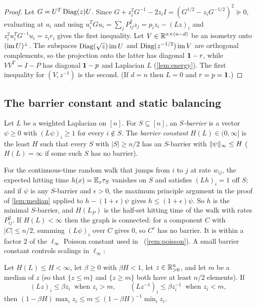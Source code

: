 \begin{proof}
Let $G=U^T\operatorname{Diag}(z)U$. Since $G+z_i^2G^{-1}-2z_iI=(G^{1/2}-z_iG^{-1/2})^2\succeq0$,
evaluating at $u_i$ and using $u_i^TGu_i=\sum_jP_{ij}^2z_j=p_iz_i-(Lz)_i$ and
$z_i^2u_i^TG^{-1}u_i=z_ir_i$ gives the first inequality. Let
$V\in\mathbb R^{n\times(n-d)}$ be an isometry onto $(\operatorname{im} U)^\perp$. The subspaces
$\operatorname{Diag}(\sqrt z)\operatorname{im} U$ and $\operatorname{Diag}(z^{-1/2})\operatorname{im} V$ are orthogonal complements, so
the projection onto the latter has diagonal $\mathbf 1-r$, while $VV^T=I-P$ has
diagonal $\mathbf 1-p$ and Laplacian $L$ (\cref{lem:energy}). The first inequality
for $(V,z^{-1})$ is the second. (If $d=n$ then $L=0$ and $r=p=\mathbf 1$.)
\end{proof}

\subsection{The barrier constant and static balancing}

\begin{definition}\label{def:barrier}
Let $L$ be a weighted Laplacian on $[n]$. For $S\subseteq[n]$, an
\emph{$S$-barrier} is a vector $\psi\ge0$ with $(L\psi)_i\ge1$ for every
$i\notin S$. The \emph{barrier constant} $H(L)\in(0,\infty]$ is the least $H$ such
that every $S$ with $|S|\ge n/2$ has an $S$-barrier with $\lVert \psi\rVert_\infty\le H$
($H(L)=\infty$ if some such $S$ has no barrier).
\end{definition}

For the continuous-time random walk that jumps from $i$ to $j$ at rate $w_{ij}$,
the expected hitting time $h(x)=\mathbb E_x\tau_S$ vanishes on $S$ and satisfies
$(Lh)_i=1$ off $S$; and if $\psi$ is any $S$-barrier and $\epsilon>0$, the maximum
principle argument in the proof of \cref{lem:median} applied to
$h-(1+\epsilon)\psi$ gives $h\le(1+\epsilon)\psi$. So $h$ is the minimal $S$-barrier,
and $H(L_P)$ is the half-set hitting time of the walk with rates $P_{ij}^2$. If
$H(L)<\infty$ then the graph is connected: for a component $C$ with
$|C|\le n/2$, summing $(L\psi)_i$ over $C$ gives $0$, so $C^c$ has no barrier. It is within a factor $2$ of the $\ell_\infty$ Poisson constant used
in~\cite{Orig} (\cref{rem:poisson}). A small barrier constant controls scalings
in $\ell_\infty$:

\begin{lemma}\label{lem:median}
Let $H(L)\le H<\infty$, let $\beta\ge0$ with $\beta H<1$, let
$z\in\mathbb R^n_{>0}$, and let $m$ be a median of $z$ (so that $\{z\le m\}$ and
$\{z\ge m\}$ both have at least $n/2$ elements). If
\[
 (Lz)_i\le\beta z_i\ \text{ when }z_i>m,\qquad
 (Lz^{-1})_i\le\beta z_i^{-1}\ \text{ when }z_i<m ,
\]
then $(1-\beta H)\max_iz_i\le m\le(1-\beta H)^{-1}\min_iz_i$.
\end{lemma}

